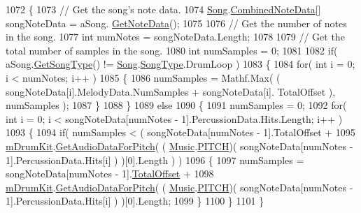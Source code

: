 \begin{DoxyCode}
1072     \{
1073         \textcolor{comment}{// Get the song's note data.}
1074         \hyperlink{class_song}{Song}.\hyperlink{group___song_structs_struct_song_1_1_combined_note_data}{CombinedNoteData}[] songNoteData = aSong.
      \hyperlink{group___song_pub_func_gae3df1fd5448b7d9cefb0fed4af967985}{GetNoteData}();
1075 
1076         \textcolor{comment}{// Get the number of notes in the song.}
1077         \textcolor{keywordtype}{int} numNotes = songNoteData.Length;
1078 
1079         \textcolor{comment}{// Get the total number of samples in the song.}
1080         \textcolor{keywordtype}{int} numSamples = 0;
1081 
1082         \textcolor{keywordflow}{if}( aSong.\hyperlink{group___song_pub_func_gabae5b5d8f727b2d9da7867a99347f86b}{GetSongType}() != \hyperlink{class_song}{Song}.\hyperlink{group___song_enums_gae681a1f001333e39fc1cb4fea97bfe1b}{SongType}.DrumLoop )
1083         \{
1084             \textcolor{keywordflow}{for}( \textcolor{keywordtype}{int} i = 0; i < numNotes; i++ )
1085             \{
1086                 numSamples = Mathf.Max( ( songNoteData[i].MelodyData.NumSamples + songNoteData[i].
      TotalOffset ), numSamples );
1087             \}
1088         \}
1089         \textcolor{keywordflow}{else}
1090         \{
1091             numSamples = 0;
1092             \textcolor{keywordflow}{for}( \textcolor{keywordtype}{int} i = 0; i < songNoteData[numNotes - 1].PercussionData.Hits.Length; i++ )
1093             \{
1094                 \textcolor{keywordflow}{if}( numSamples < ( songNoteData[numNotes - 1].TotalOffset +
1095                     \hyperlink{group___v_i_m_priv_ga0bc7c9f776b0d2dae0ccb1f1ee5f2143}{mDrumKit}.\hyperlink{group___v_i_base_pub_func_gaf715f7c3bbd2f1a2fa543b2f0684f8a6}{GetAudioDataForPitch}( (
      \hyperlink{class_music}{Music}.\hyperlink{group___music_enums_ga508f69b199ea518f935486c990edac1d}{PITCH})( songNoteData[numNotes - 1].PercussionData.Hits[i] ) )[0].Length ) )
1096                 \{
1097                     numSamples = songNoteData[numNotes - 1].\hyperlink{group___song_structs_a9a0f4830f464d3c7e7f4f156ce490cec}{TotalOffset} +
1098                         \hyperlink{group___v_i_m_priv_ga0bc7c9f776b0d2dae0ccb1f1ee5f2143}{mDrumKit}.\hyperlink{group___v_i_base_pub_func_gaf715f7c3bbd2f1a2fa543b2f0684f8a6}{GetAudioDataForPitch}( (
      \hyperlink{class_music}{Music}.\hyperlink{group___music_enums_ga508f69b199ea518f935486c990edac1d}{PITCH})( songNoteData[numNotes - 1].PercussionData.Hits[i] ) )[0].Length;
1099                 \}
1100             \}
1101         \}

\end{DoxyCode}
